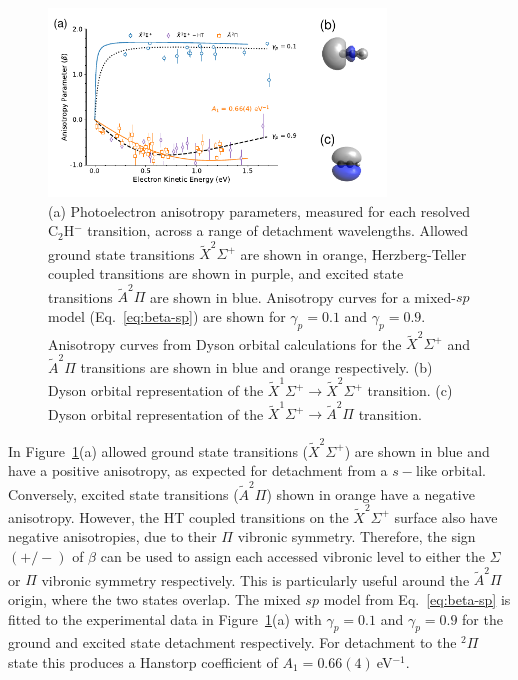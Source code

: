 \documentclass[aip,graphicx]{revtex4-1}
\begin{document}
\begin{figure}[th!]
	\includegraphics[width=0.8\textwidth]{figures/PAD}
	\caption{(a) Photoelectron anisotropy parameters, measured for each resolved C$_2$H$^-$ transition, across a range of detachment wavelengths. Allowed ground state transitions $\tilde{X}^2\Sigma^+$ are shown in orange, Herzberg-Teller coupled transitions are shown in purple, and excited state transitions $\tilde{A} ^2\Pi$ are shown in blue. Anisotropy curves for a mixed-$sp$ model (Eq.~\ref{eq:beta-sp}) are shown for $\gamma_p=0.1$ and $\gamma_p=0.9$. Anisotropy curves from Dyson orbital calculations for the $\tilde{X}^2\Sigma^+$ and $\tilde{A} ^2\Pi$ transitions are shown in blue and orange respectively. (b) Dyson orbital representation of the $\tilde{X}^1\Sigma^+\rightarrow\tilde{X}^2\Sigma^+$ transition. (c) Dyson orbital representation of the $\tilde{X}^1\Sigma^+\rightarrow\tilde{A} ^2\Pi$ transition.}
	\label{fig:5}
\end{figure}

In Figure~\ref{fig:5}(a) allowed ground state transitions ($\tilde{X}^2\Sigma^+$) are shown in blue and have a positive anisotropy, as expected for detachment from a $s-$like orbital. Conversely, excited state transitions ($\tilde{A} ^2\Pi$) shown in orange have a negative anisotropy. However, the HT coupled transitions on the $\tilde{X} ^2\Sigma^+$ surface also have negative anisotropies, due to their $\Pi$ vibronic symmetry. Therefore, the sign $(+/-)$ of $\beta$ can be used to assign each accessed vibronic level to either the $\Sigma$ or $\Pi$ vibronic symmetry respectively. This is particularly useful around the $\tilde{A} ^2\Pi$ origin, where the two states overlap. The mixed $sp$ model from Eq.~\ref{eq:beta-sp} is fitted to the experimental data in Figure~\ref{fig:5}(a) with $\gamma_p=0.1$ and $\gamma_p=0.9$ for the ground and excited state detachment respectively. For detachment to the $^2\Pi$ state this produces a Hanstorp coefficient of $A_1=0.66(4)~$eV$^{-1}$.
\end{document}
